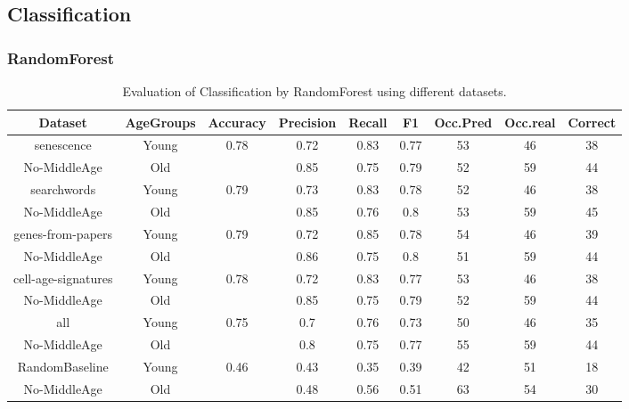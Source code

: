 \subsection*{Classification}
\subsubsection*{RandomForest}
\begin{table}[H]
	\centering
	\small
	\begin{tabular}{|c|c|c|c|c|c|c|c|c|}
		\hline
		\textbf{Dataset} & \textbf{AgeGroups} & \textbf{Accuracy} & \textbf{Precision} & \textbf{Recall} & \textbf{F1} & \textbf{Occ.Pred} & \textbf{Occ.real} & \textbf{Correct} \\ \hline
		senescence & Young & 0.78 & 0.72 & 0.83 & 0.77 & 53 & 46 & 38 \\
		No-MiddleAge & Old &   & 0.85 & 0.75 & 0.79 & 52 & 59 & 44 \\
		\hline
		searchwords & Young & 0.79 & 0.73 & 0.83 & 0.78 & 52 & 46 & 38 \\
		No-MiddleAge & Old &   & 0.85 & 0.76 & 0.8 & 53 & 59 & 45 \\
		\hline
		genes-from-papers & Young & 0.79 & 0.72 & 0.85 & 0.78 & 54 & 46 & 39 \\
		No-MiddleAge & Old &   & 0.86 & 0.75 & 0.8 & 51 & 59 & 44 \\
		\hline
		cell-age-signatures & Young & 0.78 & 0.72 & 0.83 & 0.77 & 53 & 46 & 38 \\
		No-MiddleAge & Old &   & 0.85 & 0.75 & 0.79 & 52 & 59 & 44 \\
		\hline
		all & Young & 0.75 & 0.7 & 0.76 & 0.73 & 50 & 46 & 35 \\
		No-MiddleAge & Old &   & 0.8 & 0.75 & 0.77 & 55 & 59 & 44 \\
		\hline
		RandomBaseline & Young & 0.46 & 0.43 & 0.35 & 0.39 & 42 & 51 & 18 \\
		No-MiddleAge & Old &   & 0.48 & 0.56 & 0.51 & 63 & 54 & 30 \\
		\hline
	\end{tabular}
	\caption{Evaluation of Classification by RandomForest using different datasets.}
	\label{tab:ClassificationRandomForestNo-MiddleAge}
\end{table}